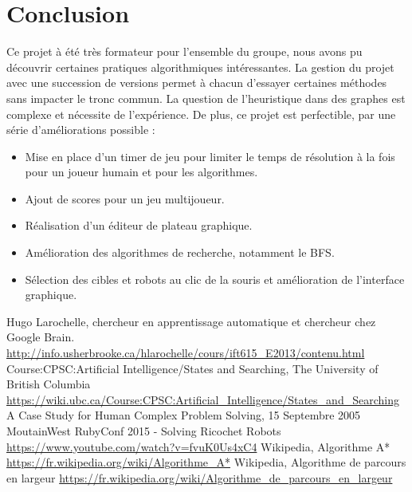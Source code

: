 \documentclass[a4paper]{article} %
\begin{document}
\pagebreak
\section*{Conclusion}
Ce projet à été très formateur pour l'ensemble du groupe, nous avons pu découvrir certaines pratiques algorithmiques intéressantes. La gestion du projet avec une succession de versions permet à chacun d'essayer certaines méthodes sans impacter le tronc commun. La question de l'heuristique dans des graphes est complexe et nécessite de l'expérience. De plus, ce projet est perfectible, par une série d'améliorations possible :
\begin{itemize}
\item Mise en place d'un timer de jeu pour limiter le temps de résolution à la fois pour un joueur humain et pour les algorithmes.
\item Ajout de scores pour un jeu multijoueur.
\item Réalisation d'un éditeur de plateau graphique.
\item Amélioration des algorithmes de recherche, notamment le BFS.
\item Sélection des cibles et robots au clic de la souris et amélioration de l'interface graphique.
\end{itemize}

\begin{thebibliography}{9}
 Hugo Larochelle, chercheur en apprentissage automatique et chercheur chez Google Brain. \url{http://info.usherbrooke.ca/hlarochelle/cours/ift615_E2013/contenu.html}
 Course:CPSC:Artificial Intelligence/States and Searching, The University of British Columbia \url{https://wiki.ubc.ca/Course:CPSC:Artificial_Intelligence/States_and_Searching}
 A Case Study for Human Complex Problem Solving, 15 Septembre 2005
 MoutainWest RubyConf 2015 - Solving Ricochet Robots \url{https://www.youtube.com/watch?v=fvuK0Us4xC4}
 Wikipedia, Algorithme A* \url{https://fr.wikipedia.org/wiki/Algorithme_A*}
 Wikipedia, Algorithme de parcours en largeur \url{https://fr.wikipedia.org/wiki/Algorithme_de_parcours_en_largeur}
\end{thebibliography}
\end{document}
